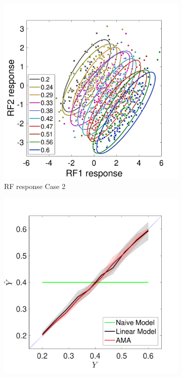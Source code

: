 \documentclass{jov}
\begin{document}
\begin{figure}
\centering
    \begin{subfigure}[b]{0.3	 \textwidth}   
        \includegraphics[width=\textwidth]{../Figures/Figure10/Figure10_a.pdf}
        \caption{RF response Case 2}
        \label{fig:case2RFResponse}
    \end{subfigure}
        \begin{subfigure}[b]{0.3 \textwidth}
        \includegraphics[width=\textwidth]{../Figures/Figure10/Figure10_b.pdf}

\end{subfigure}
\end{figure}
\end{document}
